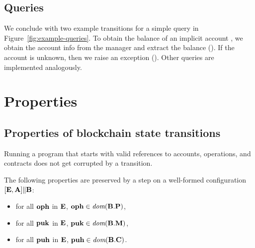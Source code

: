 \documentclass[runningheads]{llncs}
\begin{document}
\subsection{Queries}
\label{sec:queries}


We conclude with two example transitions for a simple query in
Figure~\ref{fig:example-queries}. To obtain the balance of an implicit
account \PUK, we obtain the account info from the manager and extract
the balance (). If the account is
unknown, then we raise an exception
(). Other queries are implemented analogously.

\section{Properties}
\label{sec:properties}

\subsection{Properties of blockchain state transitions}

Running a program that starts with valid references to accounts,
operations, and contracts does not get corrupted by a transition.
\begin{proposition}
  The following properties are preserved by a step on a well-formed
  configuration $ [\textbf{E}, \textbf{A}] \| \textbf{B}$:
  \begin{itemize}
  \item for all $\textbf{oph}$ in $\textbf{E}$, $\textbf{oph} \in \textit{dom} (\textbf{B}.\textbf{P})$,
  \item for all $\textbf{puk}$ in $\textbf{E}$, $\textbf{puk} \in \textit{dom} (\textbf{B}.\textbf{M})$,
  \item for all $\textbf{puh}$ in $\textbf{E}$, $\textbf{puh} \in \textit{dom} (\textbf{B}.\textbf{C})$.
  \end{itemize}
\end{proposition}
\end{document}
